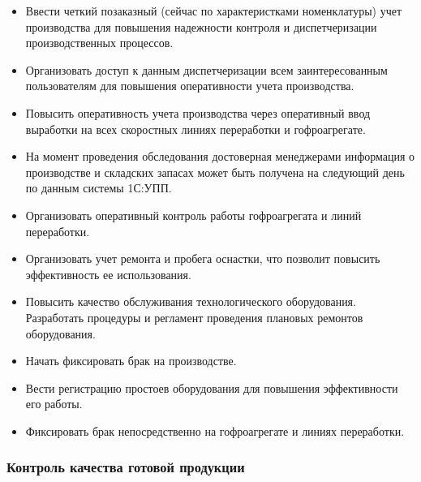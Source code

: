  \begin{itemize}
\item Ввести четкий позаказный (сейчас по характеристками номенклатуры) учет производства для повышения надежности контроля и диспетчеризации производственных процессов.
 \item Организовать доступ к данным диспетчеризации всем заинтересованным пользователям для повышения оперативности учета производства.
 \item Повысить оперативность учета производства через оперативный ввод выработки на всех скоростных линиях переработки и гофроагрегате.
 \item На момент проведения обследования достоверная менеджерами информация о производстве и складских запасах может быть получена на следующий день по данным системы 1С:УПП.

 \item Организовать оперативный контроль работы гофроагрегата и линий переработки. 
\item Организовать учет ремонта и пробега оснастки, что позволит повысить эффективность ее использования. 
\item Повысить качество обслуживания технологического оборудования. Разработать процедуры и регламент проведения плановых ремонтов оборудования.
 \item Начать фиксировать брак на производстве.

 \item Вести регистрацию простоев оборудования для повышения эффективности его работы.
 
 \item Фиксировать брак непосредственно на гофроагрегате и линиях переработки.

 \end{itemize}

 \subsubsection{Контроль качества готовой продукции}

